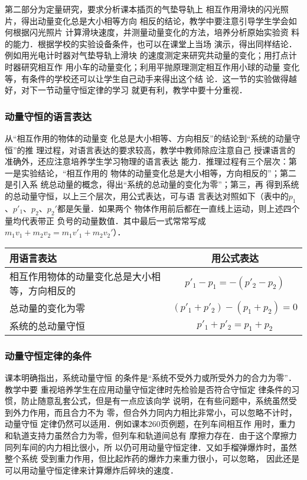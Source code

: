 第二部分为定量研究，要求分析课本插页的气垫导轨上
相互作用滑块的闪光照片，得出动量变化总是大小相等方向
相反的结论，教学中要注意引导学生学会如何根据闪光照片
计算滑块速度，并测量动量变化的方法，培养分析原始实验资
料的能力．根据学校的实验设备条件，也可以在课堂上当场
演示，得出同样结论．例如用光电计时器对气垫导轨上滑块
的速度测定来研究共动量的变化；用打点计时器研究相互作
用小车的动量变化；利用平抛原理测定相互作用小球的动量
变化等，有条件的学校还可以让学生自己动手来得出这个结
论．这一节的实验做得越好，对下一节动量守恒定律的学习
就更有利，教学中要十分重视．

\subsubsection{动量守恒的语言表达}

从“相互作用的物体的动量变
化总是大小相等、方向相反”的结论到“系统的动量守恒”的推
理过程，对语言表达的要求较高，教学中教师除应注意自己
授课语言的准确外，还应注意培养学生学习物理的语言表达
能力．推理过程有三个层次：第一是实验结论，“相互作用的
物体的动量变化总是大小相等，方向相反的”；第二是引入系
统总动量的概念，得出“系统的总动量的变化为零”；第三，再
得到系统的总动量守恒，以上三个层次，用公式表达，可与语
言表达对照如下（表中的$p_1$、$p'_1$、$p_2$、$p_2'$都是矢量．如果两个
物体作用前后都在一直线上运动，则上述四个量均代表带正
负号的动量数值．其中最后一式常常写成$m_1v_1+m_2v_2=m_1v'_1
+m_2v_2'$）．

\begin{center}
\begin{tabular}{p{}c}
    \hline
    用语言表达&用公式表达\\
    \hline
    相互作用物体的动量变化总是大小相等，方向相反的&$p'_1-p_1=-(p'_2-p_2)$\\
    总动量的变化为零&$(p'_1+p'_2)-(p_1+p_2)=0$\\
    系统的总动量守恒&$p'_1+p'_2=p_1+p_2$\\
    \hline
\end{tabular}
\end{center}

\subsubsection{动量守恒定律的条件}
课本明确指出，系统动量守恒
的条件是“系统不受外力或所受外力的合力为零”．教学中要
重视培养学生在应用动量守恒定律时先检验是否符合守恒定
律条件的习惯，防止随意乱套公式，但是有一点应该向学
说明，在有些问题中，系统虽然受到外力作用，而且合力不为
零，但合外力同内力相比非常小，可以忽略不计时，动量守恒
定律仍然可以适用．例如课本260页例题，在列车间相互作
用时，重力和轨道支持力虽然合力为零，但列车和轨道间总有
摩擦力存在．由于这个摩擦力同列车间的内力相比很小，所
以仍可用动量守恒定律．又如手榴弹爆炸时，虽然整个系统
受到重力作用，但比起炸药的爆炸力来重力很小，可以忽略，
因此还是可以用动量守恒定律来计算爆炸后碎块的速度．

